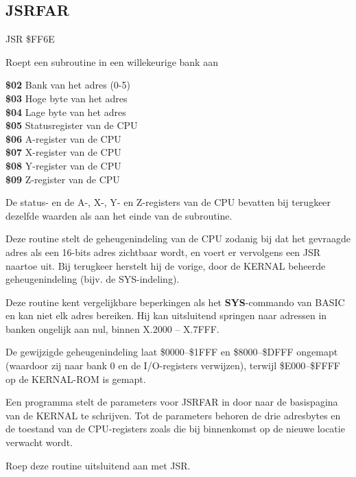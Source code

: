 
\newpage
\subsection{JSRFAR}
\label{KERNAL Jump Table!JSRFAR}
\begin{description}[leftmargin=2cm,style=nextline]
    \item [Adres:] JSR \$FF6E    \item [Omschrijving:] Roept een subroutine in een willekeurige bank aan    \item [Invoer:]        \textbf{\$02} Bank van het adres (0-5) \\        \textbf{\$03} Hoge byte van het adres \\        \textbf{\$04} Lage byte van het adres \\        \textbf{\$05} Statusregister van de CPU \\        \textbf{\$06} A-register van de CPU \\        \textbf{\$07} X-register van de CPU \\        \textbf{\$08} Y-register van de CPU \\        \textbf{\$09} Z-register van de CPU    \item [Uitvoer:]        De status- en de A-, X-, Y- en Z-registers van de CPU bevatten bij terugkeer dezelfde waarden als aan het einde van de subroutine.    \item [Opmerkingen:]        Deze routine stelt de geheugenindeling van de CPU zodanig bij dat het gevraagde adres als een 16-bits adres zichtbaar wordt, en voert er vervolgens een JSR naartoe uit. Bij terugkeer herstelt hij de vorige, door de KERNAL beheerde geheugenindeling (bijv. de SYS-indeling).

        Deze routine kent vergelijkbare beperkingen als het \textbf{SYS}-commando van BASIC en kan niet elk adres bereiken. Hij kan uitsluitend springen naar adressen in banken ongelijk aan nul, binnen X.2000 -- X.7FFF.

        De gewijzigde geheugenindeling laat \$0000--\$1FFF en \$8000--\$DFFF ongemapt (waardoor zij naar bank 0 en de I/O-registers verwijzen), terwijl \$E000--\$FFFF op de KERNAL-ROM is gemapt.

        Een programma stelt de parameters voor JSRFAR in door naar de basispagina van de KERNAL te schrijven. Tot de parameters behoren de drie adresbytes en de toestand van de CPU-registers zoals die bij binnenkomst op de nieuwe locatie verwacht wordt.

        Roep deze routine uitsluitend aan met JSR.    \item [Voorbeeld:]
\end{description}


